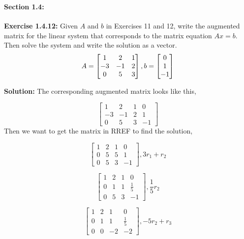 \documentclass{amsart}
\begin{document}
\thispagestyle{fancy}


{\huge\textbf{Section 1.4:}}\\\\
\noindent\textbf{Exercise 1.4.12: } Given $A$ and $b$ in Exercises 11 and 12, write the augmented matrix for the linear system that corresponds to the matrix equation $Ax=b$. Then solve the system and write the solution as a vector.
\begin{equation}
A=
\begin{bmatrix}
1&2&1\\
-3&-1&2\\
0&5&3
\end{bmatrix}\\
, b=
\begin{bmatrix}
0\\
1\\
-1
\end{bmatrix}
\end{equation}

\noindent \textbf{Solution: }
The corresponding augmented matrix looks like this,

\begin{equation}
\begin{bmatrix}
1&2&1&0\\
-3&-1&2&1\\
0&5&3&-1
\end{bmatrix}
\end{equation}
Then we want to get the matrix in RREF to find the solution,

\begin{equation}
\begin{bmatrix}
1&2&1&0\\
0&5&5&1\\
0&5&3&-1
\end{bmatrix},  3r_1+r_2
\end{equation}

\begin{equation}
\begin{bmatrix}
1&2&1&0\\
0&1&1&\frac{1}{5}\\
0&5&3&-1
\end{bmatrix},  \frac{1}{5}r_2
\end{equation}

\begin{equation}
\begin{bmatrix}
1&2&1&0\\
0&1&1&\frac{1}{5}\\
0&0&-2&-2
\end{bmatrix}, -5r_2+r_3
\end{equation}
\end{document}
